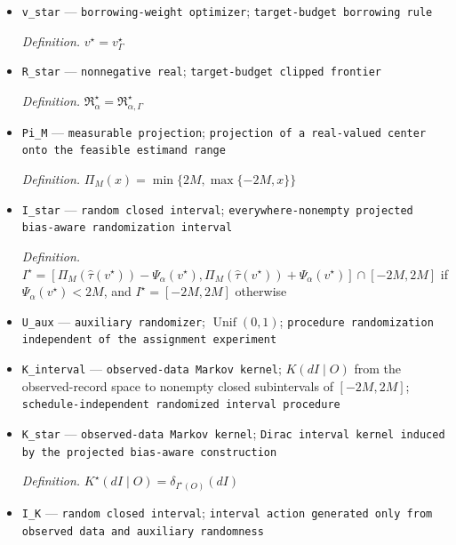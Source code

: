 \documentclass{article}
\begin{document}
\begin{itemize}
  \par\smallskip\noindent\emph{Definition.} \(\Psi_\alpha(v)=\Psi_{\alpha,\Gamma}(v)\)
  \item \texttt{v\_\allowbreak{}star} --- \texttt{borrowing-\allowbreak{}weight optimizer}; \texttt{target-\allowbreak{}budget borrowing rule}
  \par\smallskip\noindent\emph{Definition.} \(v^\star=v_\Gamma^\star\)
  \item \texttt{R\_\allowbreak{}star} --- \texttt{nonnegative real}; \texttt{target-\allowbreak{}budget clipped frontier}
  \par\smallskip\noindent\emph{Definition.} \(\mathfrak R_\alpha^\star=\mathfrak R_{\alpha,\Gamma}^\star\)
  \item \texttt{Pi\_\allowbreak{}M} --- \texttt{measurable projection}; \texttt{projection of a real-\allowbreak{}valued center onto the feasible estimand range}
  \par\smallskip\noindent\emph{Definition.} \(\Pi_M(x)=\min\{2M,\max\{-2M,x\}\}\)
  \item \texttt{I\_\allowbreak{}star} --- \texttt{random closed interval}; \texttt{everywhere-\allowbreak{}nonempty projected bias-\allowbreak{}aware randomization interval}
  \par\smallskip\noindent\emph{Definition.} \(I^\star=[\Pi_M(\widehat\tau(v^\star))-\Psi_\alpha(v^\star),\Pi_M(\widehat\tau(v^\star))+\Psi_\alpha(v^\star)]\cap[-2M,2M]\) if \(\Psi_\alpha(v^\star)<2M\), and \(I^\star=[-2M,2M]\) otherwise
  \item \texttt{U\_\allowbreak{}aux} --- \texttt{auxiliary randomizer}; \(\operatorname{Unif}(0,1)\); \texttt{procedure randomization independent of the assignment experiment}
  \item \texttt{K\_\allowbreak{}interval} --- \texttt{observed-\allowbreak{}data Markov kernel}; \(K(dI\mid O)\) from the observed-record space to nonempty closed subintervals of \([-2M,2M]\); \texttt{schedule-\allowbreak{}independent randomized interval procedure}
  \item \texttt{K\_\allowbreak{}star} --- \texttt{observed-\allowbreak{}data Markov kernel}; \texttt{Dirac interval kernel induced by the projected bias-\allowbreak{}aware construction}
  \par\smallskip\noindent\emph{Definition.} \(K^\star(dI\mid O)=\delta_{I^\star(O)}(dI)\)
  \item \texttt{I\_\allowbreak{}K} --- \texttt{random closed interval}; \texttt{interval action generated only from observed data and auxiliary randomness}

\end{itemize}
\end{document}
